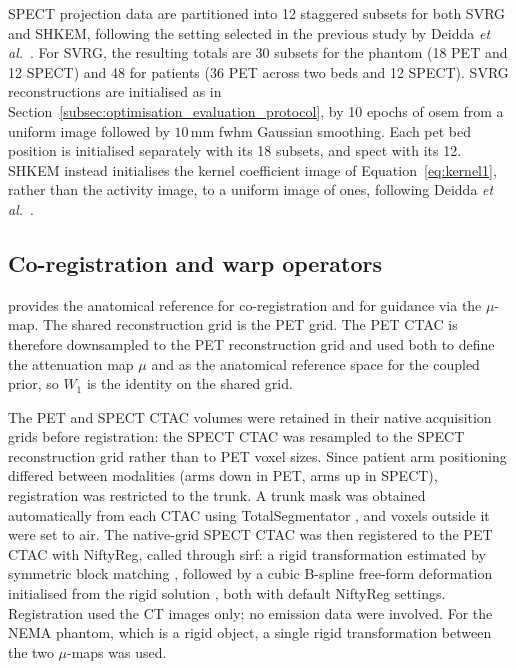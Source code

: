 SPECT projection data are partitioned into 12 staggered subsets for both SVRG and SHKEM, following the setting selected in the previous study by Deidda \textit{et al.}\ \cite{deiddaTripleModalityImage2023}. For SVRG, the resulting totals are 30 subsets for the phantom (18 PET and 12 SPECT) and 48 for patients (36 PET across two beds and 12 SPECT). SVRG reconstructions are initialised as in Section~\ref{subsec:optimisation_evaluation_protocol}, by 10 epochs of \gls{osem} from a uniform image followed by $10\,\mathrm{mm}$ \gls{fwhm} Gaussian smoothing. Each \gls{pet} bed position is initialised separately with its 18 subsets, and \gls{spect} with its 12. SHKEM instead initialises the kernel coefficient image of Equation~\eqref{eq:kernel1}, rather than the activity image, to a uniform image of ones, following Deidda \textit{et al.}\ \cite{deiddaTripleModalityImage2023}.

\subsection{Co-registration and warp operators}
\label{subsubsec:90y_warps}

 provides the anatomical reference for co-registration and for guidance via the $\mu$-map. The shared reconstruction grid is the PET grid. The PET CTAC is therefore downsampled to the PET reconstruction grid and used both to define the attenuation map $\mu$ and as the anatomical reference space for the coupled prior, so $W_1$ is the identity on the shared grid.

The PET and SPECT CTAC volumes were retained in their native acquisition grids before registration: the SPECT CTAC was resampled to the SPECT reconstruction grid rather than to PET voxel sizes. Since patient arm positioning differed between modalities (arms down in PET, arms up in SPECT), registration was restricted to the trunk. A trunk mask was obtained automatically from each CTAC using TotalSegmentator \cite{wasserthalTotalSegmentatorRobustSegmentation2023}, and voxels outside it were set to air. The native-grid SPECT CTAC was then registered to the PET CTAC with NiftyReg, called through \gls{sirf}: a rigid transformation estimated by symmetric block matching \cite{modatGlobalImageRegistration2014}, followed by a cubic B-spline free-form deformation initialised from the rigid solution \cite{modatFastFreeformDeformation2010}, both with default NiftyReg settings. Registration used the CT images only; no emission data were involved. For the NEMA phantom, which is a rigid object, a single rigid transformation between the two $\mu$-maps was used.

